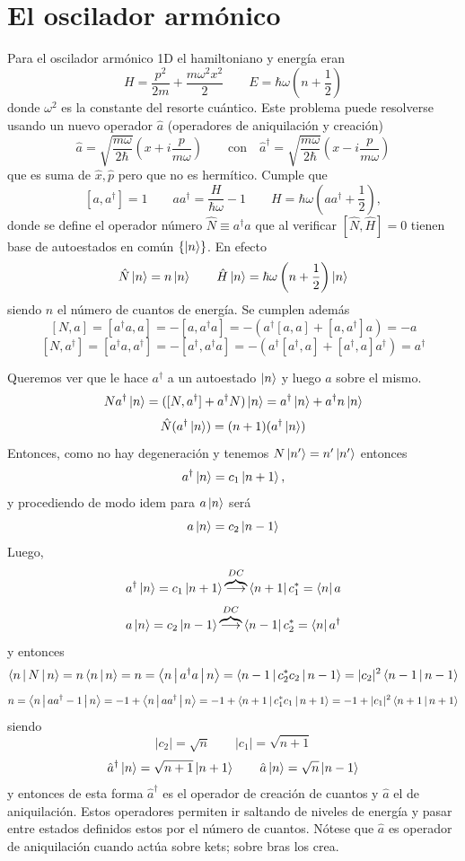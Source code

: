 \documentclass[10pt,oneside]{CBFT_book}
\begin{document}
% 
\chapter{El oscilador armónico}

Para el oscilador armónico 1D  el hamiltoniano y energía eran
\[
	H = \frac{p^2}{2m} + \frac{m\omega^2 x^2}{2} \qquad E = \hbar \omega \left( n + \frac{1}{2} \right)
\]
donde $\omega^2$ es la constante del resorte cuántico.
Este problema puede resolverse usando un nuevo operador $\hat{a}$ (operadores de aniquilación
y creación)
\[
	\hat{a} = \sqrt{\frac{m\omega}{2\hbar}}\left( x + i\frac{p}{m\omega} \right) \qquad \text{con} \quad 
	\hat{a}^\dagger = \sqrt{\frac{m\omega}{2\hbar}}\left( x - i\frac{p}{m\omega} \right)
\]
que es suma de $\hat{x}, \hat{p}$ pero que no es hermítico. Cumple que 
\[
	[a , a^\dagger ] = 1 \qquad a a^\dagger =  \frac{H}{\hbar\omega} -1 \qquad 
	H = \hbar\omega \left( a a^\dagger + \frac{1}{2} \right),
\]
donde se define el operador número $\hat{N}\equiv a^\dagger a$ que al verificar $[\hat{N},\hat{H}]=0$ tienen 
base de 
autoestados en común $\{ \Ket{n} \}$. En efecto 
\[
	\hat{N} \Ket{n} = n\Ket{n} \qquad
	\hat{H} \Ket{n} = \hbar\omega \left( n + \frac{1}{2} \right) \Ket{n}
\]
siendo $n$ el número de cuantos de energía.
Se cumplen además 
\[
	[N,a] = [a^\dagger a,a] = - [ a, a^\dagger a ] = - \left( a^\dagger [a,a] + [a,a^\dagger]a \right) =
	-a
\]
\[
	[N,a^\dagger] = [a^\dagger a, a^\dagger ] = - [a^\dagger , a^\dagger a ] =
	- \left( a^\dagger [a^\dagger,a] + [a^\dagger,a]a^\dagger \right) = a^\dagger
\]

Queremos ver que le  hace $a^\dagger$  a un autoestado $\Ket{n}$ y luego $a$ sobre el mismo.
\[
	N a^\dagger \Ket{n} = ([N, a^\dagger] + a^\dagger N) \Ket{n} =
	a^\dagger \Ket{n} + a^\dagger n \Ket{n} 
\]
\[
	\Hat{N} (a^\dagger\Ket{n}) = (n+1)(a^\dagger\Ket{n})
\]
Entonces, como no hay degeneración y tenemos $N\Ket{n'} = n'\Ket{n'}$ entonces 
\[
	a^\dagger \Ket{n} = c_1 \Ket{n+1},
\]
y procediendo de modo idem para $a\ket{n}$ será
\[
	a \Ket{n} = c_2 \Ket{n-1}
\]
Luego,
\[
	a^\dagger \Ket{n} = c_1 \Ket{n+1} \overbrace{\longrightarrow}^{DC} 
	\Bra{n+1} c_1^* = \Bra{n} a 
\]
\[
	a \Ket{n} = c_2 \Ket{n-1} \overbrace{\longrightarrow}^{DC} \Bra{n-1} c_2^* = \Bra{n} a^\dagger
\]
y entonces 
\[
	\Braket{n|N|n} = n \Braket{n|n} = n =  \Braket{n| a^\dagger a |n} =  \Braket{n-1|c_2^* c_2|n-1} =
	|c_2|^2 \Braket{n-1|n-1}
\]
\[
	n = \Braket{n|aa^\dagger-1|n} = -1 + \Braket{n|aa^\dagger|n} = - 1 + \Braket{n+1|c_1^*c_1|n+1} =
	-1 + |c_1|^2 \Braket{n+1|n+1}
\]
siendo
\[
	|c_2| = \sqrt{n} \qquad |c_1| = \sqrt{n+1} 
\]
\[
	\hat{a}^\dagger \Ket{n} = \sqrt{n+1} \Ket{n+1} \qquad  \hat{a}\Ket{n} = \sqrt{n} \Ket{n-1} 
\]
y entonces de esta forma $\hat{a}^\dagger$ es el operador de creación de cuantos y $\hat{a}$ el de 
aniquilación.
Estos operadores permiten ir saltando de niveles de energía y pasar entre estados definidos estos
por el número de cuantos.
Nótese que $\hat{a}$ es operador de aniquilación cuando actúa sobre kets; sobre bras los crea.
\end{document}
